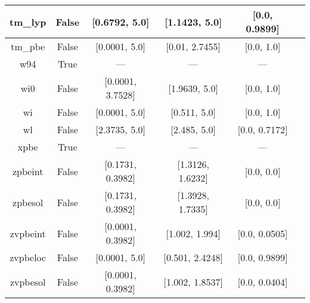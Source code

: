 \begin{tabular}{|c|c|c|c|c|l|}
       tm\_lyp &                 False &    [0.6792, 5.0] &    [1.1423, 5.0] &    [0.0, 0.9899] &                                      \cite{Thakkar2009_134109} \\ \hline
       tm\_pbe &                 False &    [0.0001, 5.0] &   [0.01, 2.7455] &       [0.0, 1.0] &                                      \cite{Thakkar2009_134109} \\ \hline
           w94 &                  True &              --- &              --- &              --- &                                          \cite{Wilson1994_337} \\ \hline
           wi0 &                 False & [0.0001, 3.7528] &    [1.9639, 5.0] &       [0.0, 1.0] &                                          \cite{Wilson1998_523} \\ \hline
            wi &                 False &    [0.0001, 5.0] &     [0.511, 5.0] &       [0.0, 1.0] &                                          \cite{Wilson1998_523} \\ \hline
            wl &                 False &    [2.3735, 5.0] &     [2.485, 5.0] &    [0.0, 0.7172] &                                        \cite{Wilson1990_12930} \\ \hline
          xpbe &                  True &              --- &              --- &              --- &                                             \cite{Xu2004_4068} \\ \hline
       zpbeint &                 False & [0.1731, 0.3982] & [1.3126, 1.6232] &       [0.0, 0.0] &                                   \cite{Constantin2011_233103} \\ \hline
       zpbesol &                 False & [0.1731, 0.3982] & [1.3928, 1.7335] &       [0.0, 0.0] &                                   \cite{Constantin2011_233103} \\ \hline
      zvpbeint &                 False & [0.0001, 0.3982] &   [1.002, 1.994] &    [0.0, 0.0505] &                                   \cite{Constantin2012_194105} \\ \hline
      zvpbeloc &                 False &    [0.0001, 5.0] &  [0.501, 2.4248] &    [0.0, 0.9899] &                                         \cite{Fabiano2015_122} \\ \hline
      zvpbesol &                 False & [0.0001, 0.3982] &  [1.002, 1.8537] &    [0.0, 0.0404] &                                   \cite{Constantin2012_194105} \\ \hline
\end{tabular}